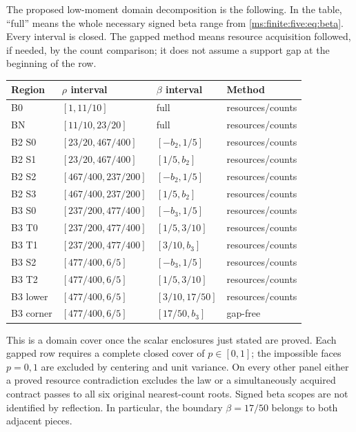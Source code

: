 The proposed low-moment domain decomposition is the following. In the
table, ``full'' means the whole necessary signed beta range from
\eqref{ms:finite:five:eq:beta}. Every interval is closed. The gapped method means
resource acquisition followed, if needed, by the count comparison; it
does not assume a support gap at the beginning of the row.
\begin{center}\small
\begin{tabular}{@{}llll@{}}\toprule
Region & $\rho$ interval & $\beta$ interval & Method\\\midrule
B0 & $[1,11/10]$ & full & resources/counts\\
BN & $[11/10,23/20]$ & full & resources/counts\\
B2 S0 & $[23/20,467/400]$ & $[-b_2,1/5]$ & resources/counts\\
B2 S1 & $[23/20,467/400]$ & $[1/5,b_2]$ & resources/counts\\
B2 S2 & $[467/400,237/200]$ & $[-b_2,1/5]$ & resources/counts\\
B2 S3 & $[467/400,237/200]$ & $[1/5,b_2]$ & resources/counts\\
B3 S0 & $[237/200,477/400]$ & $[-b_3,1/5]$ & resources/counts\\
B3 T0 & $[237/200,477/400]$ & $[1/5,3/10]$ & resources/counts\\
B3 T1 & $[237/200,477/400]$ & $[3/10,b_3]$ & resources/counts\\
B3 S2 & $[477/400,6/5]$ & $[-b_3,1/5]$ & resources/counts\\
B3 T2 & $[477/400,6/5]$ & $[1/5,3/10]$ & resources/counts\\
B3 lower & $[477/400,6/5]$ & $[3/10,17/50]$ & resources/counts\\
B3 corner & $[477/400,6/5]$ & $[17/50,b_3]$ & gap-free\\\bottomrule
\end{tabular}
\end{center}
This is a domain cover once the scalar enclosures just stated are proved.
Each gapped row requires a complete closed cover of $p\in[0,1]$;
the impossible faces $p=0,1$ are excluded by centering and unit variance.
On every other panel either a proved resource contradiction excludes the
law or a simultaneously acquired contract passes to all six original
nearest-count roots. Signed beta scopes are not identified by reflection.
In particular, the boundary $\beta=17/50$ belongs to both adjacent pieces.


